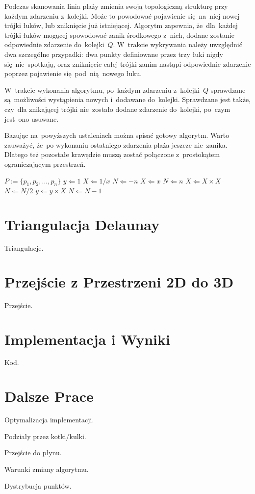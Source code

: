 \documentclass[skorowidz,autorrok,backref,xodstep,oswiadczenie]{wmimgr}
\begin{document}
Podczas skanowania linia plaży zmienia swoją topologiczną strukturę przy każdym zdarzeniu z~kolejki. Może to powodować pojawienie się~na~niej nowej trójki łuków, lub zniknięcie już istniejącej. Algorytm zapewnia, że~dla~każdej trójki łuków mogącej spowodować zanik środkowego z~nich, dodane zostanie odpowiednie zdarzenie do~kolejki~$Q$. W~trakcie wykrywania należy uwzględnić dwa szczególne przypadki: dwa punkty definiowane przez trzy łuki nigdy się~nie~spotkają, oraz zniknięcie całej trójki zanim nastąpi odpowiednie zdarzenie poprzez pojawienie się~pod~nią~nowego łuku.

W~trakcie wykonania algorytmu, po~każdym zdarzeniu z~kolejki~$Q$ sprawdzane są~możliwości wystąpienia nowych i~dodawane do~kolejki. Sprawdzane jest także, czy~dla znikającej trójki nie~zostało dodane zdarzenie do~kolejki, po~czym jest~ono usuwane.

Bazując na~powyższych ustaleniach można spisać gotowy algorytm. Warto zauważyć, że~po wykonaniu ostatniego zdarzenia plaża jeszcze nie~zanika. Dlatego też pozostałe krawędzie muszą zostać połączone z~prostokątem ograniczającym przestrzeń.

\begin{algorithm}[VoronoiDiagram]
\caption{$VoronoiDiagram(P)$}
\label{fortune}  %
\begin{algorithmic}
    \REQUIRE $P := \{p_{1}, p_{2}, ... , p_{n}\}$
    \STATE $y \Leftarrow 1$
        \STATE $X \Leftarrow 1 / x$
        \STATE $N \Leftarrow -n$
    \ELSE
        \STATE $X \Leftarrow x$
        \STATE $N \Leftarrow n$
    \ENDIF
            \STATE $X \Leftarrow X \times X$
            \STATE $N \Leftarrow N / 2$
        \ELSE[$N$ is odd]
            \STATE $y \Leftarrow y \times X$
            \STATE $N \Leftarrow N - 1$
        \ENDIF
    \ENDWHILE
\end{algorithmic}
\end{algorithm}

\chapter{Triangulacja Delaunay}

Triangulacje.

\chapter{Przejście z Przestrzeni 2D do 3D}

Przejście.

\chapter{Implementacja i Wyniki}

Kod.

\chapter{Dalsze Prace}

Optymalizacja implementacji.

Podziały przez kotki/kulki.

Przejście do płynu.

Warunki zmiany algorytmu.

Dystrybucja punktów.

%

\end{document}
